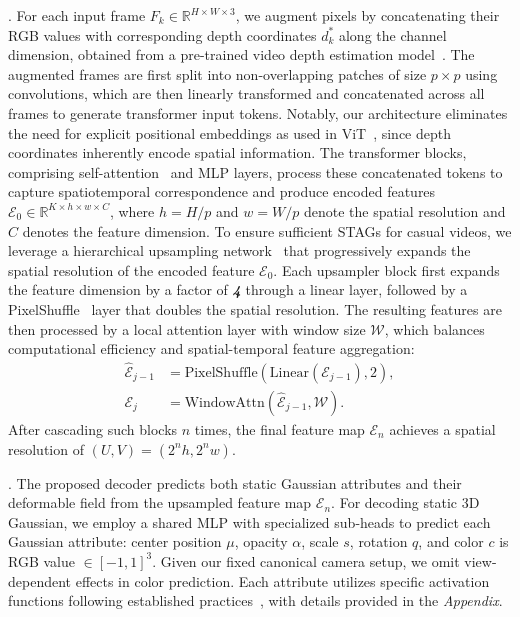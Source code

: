. For each input frame $F_{k} \in \mathbb{R}^{H \times W \times 3}$, we augment pixels by concatenating their RGB values with corresponding depth coordinates $d^{*}_{k}$ along the channel dimension, obtained from a pre-trained video depth estimation model~\cite{chen2025video}. The augmented frames are first split into non-overlapping patches of size $p \times p$ using convolutions, which are then linearly transformed and concatenated across all frames to generate transformer input tokens. Notably, our architecture eliminates the need for explicit positional embeddings as used in ViT~\cite{dosovitskiy2020image,bai2024meissonic}, since depth coordinates inherently encode spatial information. The transformer blocks, comprising self-attention~\cite{vaswani2017attention} and MLP layers, process these concatenated tokens to capture spatiotemporal correspondence and produce encoded features $\mathcal{E}_{0} \in \mathbb{R}^{K \times h \times w \times C}$, where $h = H/p$ and $w = W/p$ denote the spatial resolution and $C$ denotes the feature dimension. To ensure sufficient STAGs for casual videos, we leverage a hierarchical upsampling network~\cite{zhang2025gs, xu2024grm} that progressively expands the spatial resolution of the encoded feature $\mathcal{E}_0$.  Each upsampler block first expands the feature dimension by a factor of \textbf{\textit{4}} through a linear layer, followed by a PixelShuffle~\cite{shi2016real} layer that doubles the spatial resolution. The resulting features are then processed by a local attention layer with window size $\mathcal{W}$, which balances computational efficiency and spatial-temporal feature aggregation:
\begin{equation}
\begin{aligned}
\hat{\mathcal{E}}_{j-1} &= \text{PixelShuffle}(\text{Linear}(\mathcal{E}_{j-1}), 2), \\
\mathcal{E}_{j} &= \text{WindowAttn}(\hat{\mathcal{E}}_{j-1}, \mathcal{W}).
\end{aligned}
\end{equation}
After cascading such blocks $n$ times, the final feature map $\mathcal{E}_{n}$ achieves a spatial resolution of $(U, V) = (2^n h, 2^n w)$.

. The proposed decoder predicts both static Gaussian attributes and their deformable field from the upsampled feature map $\mathcal{E}_{n}$.
For decoding static 3D Gaussian, we employ a shared MLP with specialized sub-heads to predict each Gaussian attribute: center position $\mu$, opacity $\alpha$, scale $s$, rotation $q$, and color $c$ is RGB value $\in [-1, 1]^3$. Given our fixed canonical camera setup, we omit view-dependent effects in color prediction. Each attribute utilizes specific activation functions following established practices~\cite{pixelsplat}, with details provided in the \textit{Appendix}.

